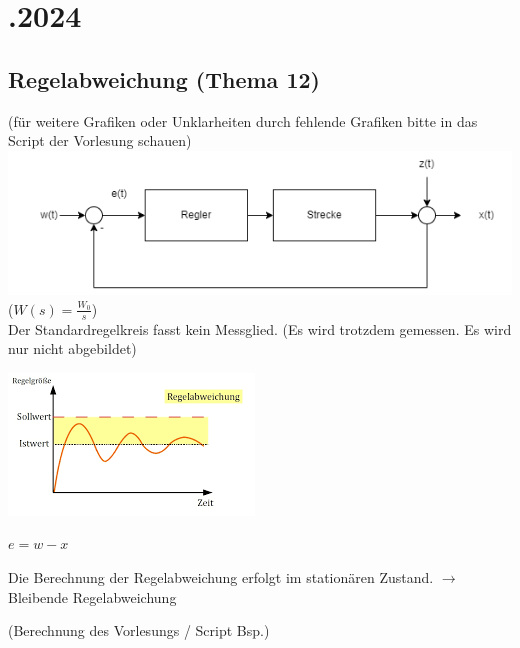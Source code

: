 \documentclass[a4paper, twoside, 11pt]{article}
\begin{document}
\newpage
\section*{.2024}
\subsection*{Regelabweichung (Thema 12)}
(für weitere Grafiken oder Unklarheiten durch fehlende Grafiken bitte in das Script der Vorlesung schauen) \\
\includegraphics[width=\textwidth]{2024_11_26_standard_regelkreis.png}
($W(s) = \frac{W_0}{s}$) \\
Der Standardregelkreis fasst kein Messglied. (Es wird trotzdem gemessen. Es wird nur nicht abgebildet) \\
\begin{multicols}{2}
	\includegraphics{2024_11_26_regelabweichung.png}

	\columnbreak
	
	\begin{center} $e = w - x$ \end{center}
	Die Berechnung der Regelabweichung erfolgt im stationären Zustand. $\to $ Bleibende Regelabweichung
\end{multicols}
\vspace{1em}
(Berechnung des Vorlesungs / Script Bsp.)
\end{document}
